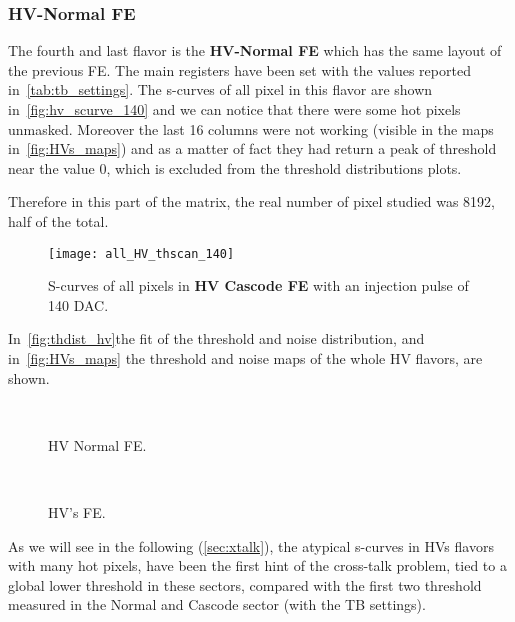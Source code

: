 \subsubsection{HV-Normal FE}\label{sec:first_xtalk}

The fourth and last flavor is the \textbf{HV-Normal FE} which has the same layout of the previous FE. The main registers have been set with the values reported in~\autoref{tab:tb_settings}.
The s-curves of all pixel in this flavor are shown in~\autoref{fig:hv_scurve_140} and we can notice that there were some hot pixels unmasked.
Moreover the last 16 columns were not working (visible in the maps in~\autoref{fig:HVs_maps}) and as a matter of fact they had return a peak of threshold near the value 0, which is excluded from the threshold distributions plots.

Therefore in this part of the matrix, the real number of pixel studied was 8192, half of the total.


\begin{figure}[h!]
\centering
\texttt{[image: all\_HV\_thscan\_140]}
\caption{S-curves of all pixels in \textbf{HV Cascode FE} with an injection pulse of 140 DAC.}
\label{fig:hv_scurve_140}
\end{figure}

In~\autoref{fig:thdist_hv}the fit of the threshold and noise distribution, and in~\autoref{fig:HVs_maps} the threshold and noise maps of the whole HV flavors, are shown. 

\begin{figure}[h!]
\centering
{}\quad
{}\\
\caption{HV Normal FE.}
\label{fig:thdist_hv}
\end{figure}


\begin{figure}[h!]
\centering
{}\quad
{}\\
\caption{HV's FE.}
\label{fig:HVs_maps}
\end{figure}

As we will see in the following (\autoref{sec:xtalk}), the atypical s-curves in HVs flavors with many hot pixels, have been the first hint of the cross-talk problem, tied to a global lower threshold in these sectors, compared with the first two threshold measured in the Normal and Cascode sector (with the TB settings). 



